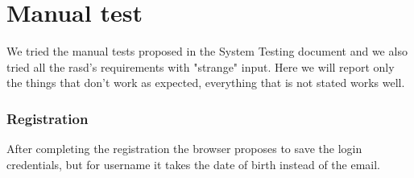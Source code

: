 \documentclass[10pt,a4paper,titlepage]{article}
\begin{document}
\part{Manual test}
We tried the manual tests proposed in the System Testing document and we also tried all the rasd's requirements with "strange" input. Here we will report only the things that don't work as expected, everything that is not stated works well.

\section{Registration}
After completing the registration the browser proposes to save the login credentials, but for username it takes the date of birth instead of the email.
\end{document}
